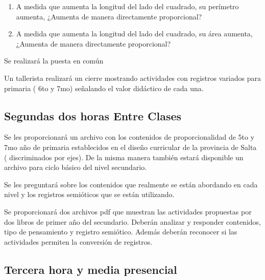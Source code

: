 \documentclass[oneside,spanish]{amsart}
\numberwithin{equation}{section}
\numberwithin{figure}{section}
\begin{document}
\begin{description}[itemsep=10pt]
\begin{enumerate}[label=\alph*), itemsep=10pt]
        \item A medida que aumenta la longitud del lado del cuadrado, su perímetro aumenta, ¿Aumenta de manera directamente proporcional?
        \item A medida que aumenta la longitud del lado del cuadrado, su área  aumenta, ¿Aumenta de manera directamente proporcional?
        
    \end{enumerate}

    Se realizará la puesta en común
    
    Un tallerista realizará un cierre  mostrando actividades con registros variados para primaria ( 6to y 7mo) señalando el valor didáctico de cada una.
    

\end{description}

\subsection{Segundas dos horas Entre Clases}

\begin{description}[itemsep=10pt]
    \item[Actividad 1]Se les proporcionará un archivo con los contenidos de proporcionalidad  de 5to y 7mo año de primaria establecidos en el diseño curricular de la provincia de Salta ( discriminados por ejes). De la misma manera también estará disponible un archivo para ciclo básico del nivel secundario.
    
    Se les preguntará sobre los contenidos que realmente se están abordando en cada nivel y los registros semióticos que se están utilizando.
    \item[Actividad 2] Se proporcionará  dos archivos pdf que muestran las actividades propuestas por dos libros de primer año del secundario. Deberán analizar y responder contenidos, tipo de pensamiento y registro semiótico. Además deberán reconocer si las actividades permiten la conversión de registros.

\end{description}

\subsection{Tercera hora y media  presencial}
\end{document}
